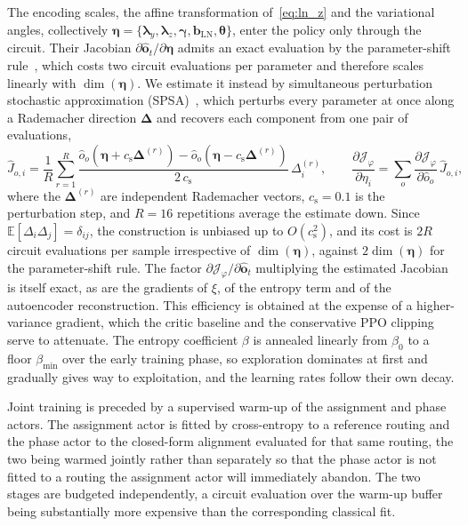 \documentclass[12pt,onecolumn]{IEEEtran}
\begin{document}
The encoding scales, the affine transformation of~\eqref{eq:ln_z} and the variational angles, collectively $\boldsymbol{\eta}=\{\boldsymbol{\lambda}_y,\boldsymbol{\lambda}_z,\boldsymbol{\gamma},\mathbf{b}_{\mathrm{LN}},\boldsymbol{\theta}\}$, enter the policy only through the circuit.
Their Jacobian $\partial\hat{\mathbf{o}}_t/\partial\boldsymbol{\eta}$ admits an exact evaluation by the parameter-shift rule~\cite{mitarai2018quantum,schuld2019evaluating}, which costs two circuit evaluations per parameter and therefore scales linearly with $\dim(\boldsymbol{\eta})$.
We estimate it instead by simultaneous perturbation stochastic approximation (SPSA)~\cite{spall1992multivariate}, which perturbs every parameter at once along a Rademacher direction $\boldsymbol{\Delta}$ and recovers each component from one pair of evaluations,
\begin{equation}
    \hat{J}_{o,i}
    =
    \frac{1}{R}\sum_{r=1}^{R}
    \frac{\hat{o}_o(\boldsymbol{\eta}+c_{\mathrm s}\boldsymbol{\Delta}^{(r)})
          - \hat{o}_o(\boldsymbol{\eta}-c_{\mathrm s}\boldsymbol{\Delta}^{(r)})}
         {2\,c_{\mathrm s}}\,\Delta^{(r)}_i,
    \qquad
    \frac{\partial\mathcal{J}_\varphi}{\partial\eta_i}
    =
    \sum_o \frac{\partial\mathcal{J}_\varphi}{\partial\hat{o}_o}\,\hat{J}_{o,i},
    \label{eq:spsa}
\end{equation}
where the $\boldsymbol{\Delta}^{(r)}$ are independent Rademacher vectors, $c_{\mathrm s}=0.1$ is the perturbation step, and $R=16$ repetitions average the estimate down. Since $\mathbb{E}[\Delta_i\Delta_j]=\delta_{ij}$, the construction is unbiased up to $O(c_{\mathrm s}^{2})$, and its cost is $2R$ circuit evaluations per sample irrespective of $\dim(\boldsymbol{\eta})$, against $2\dim(\boldsymbol{\eta})$ for the parameter-shift rule.
The factor $\partial\mathcal{J}_\varphi/\partial\hat{\mathbf{o}}_t$ multiplying the estimated Jacobian is itself exact, as are the gradients of $\xi$, of the entropy term and of the autoencoder reconstruction.
This efficiency is obtained at the expense of a higher-variance gradient, which the critic baseline and the conservative PPO clipping serve to attenuate.
The entropy coefficient $\beta$ is annealed linearly from $\beta_0$ to a floor $\beta_{\min}$ over the early training phase, so exploration dominates at first and gradually gives way to exploitation, and the learning rates follow their own decay.

Joint training is preceded by a supervised warm-up of the assignment and phase actors.
The assignment actor is fitted by cross-entropy to a reference routing and the phase actor to the closed-form alignment evaluated for that same routing, the two being warmed jointly rather than separately so that the phase actor is not fitted to a routing the assignment actor will immediately abandon.
The two stages are budgeted independently, a circuit evaluation over the warm-up buffer being substantially more expensive than the corresponding classical fit.
\end{document}
